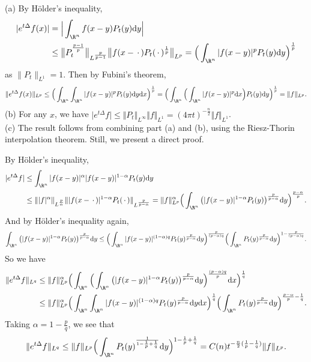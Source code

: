 \begin{itemize}
(a) By Hölder's inequality, 
\begin{align*}\vert e^{t\Delta}f(x)\vert &=\Big\vert \int_{\R^n} f(x-y)P_t(y)\mathrm{d}y\Big\vert\\ 
&\leq \big\Vert P_t^{\frac{p-1}p}\big\Vert_{L^{\frac{p}{p-1}}}\big\Vert f(x-\,\cdot\,)P_t(\,\cdot\,)^{\frac1p}\big\Vert_{L^{p}}=
\Big(\int_{\R^n} \vert f(x-y)\vert^p P_t(y) \mathrm{d}y\Big) ^{\frac1p}\end{align*}
as $\|P_t\|_{L^1}=1$. Then by Fubini's theorem, $$\Vert e^{t\Delta}f(x)\Vert_{L^p}\leq 
\Big( \int_{\R^n} \int_{\R^n} \vert f(x-y)\vert^p P_t(y)\mathrm{d}y\mathrm{d}x\Big) ^{\frac1p}=
\Big( \int_{\R^n} \Big(\int_{\R^n} \vert f(x-y)\vert^p \mathrm{d}x\Big)P_t(y)\mathrm{d}y\Big) ^{\frac1p}=\Vert f\Vert _{L^p}.$$
(b) For any $x$, we have $\vert e^{t\Delta}f\vert \leq \Vert P_t\Vert _{L^\infty} \Vert f\Vert _{L^1}=(4\pi t)^{-\frac{n}{2}}\Vert f\Vert _{L^1}$.\\
(c) The result follows from combining part (a) and (b), using the Riesz-Thorin interpolation theorem. 
Still, we present a direct proof.

By Hölder's inequality,
\begin{align*}\vert e^{t\Delta}f\vert &\leq \int_{\R^n} \vert f(x-y)\vert^\alpha\vert f(x-y)\vert^{1-\alpha} P_t(y) \mathrm{d}y\\ 
&\leq \Vert \vert f\vert^\alpha \Vert _{L^{\frac{p}\alpha}}\Vert \vert f(x-\,\cdot\,)\vert^{1-\alpha} P_t(\,\cdot\,)\Vert _{L^{\frac{p}{p-\alpha}}}
= \Vert f\Vert _{L^p}^\alpha\Big(\int_{\R^n} \big(\vert f(x-y)\vert^{1-\alpha}P_t(y)\big)^\frac{p}{p-\alpha}\mathrm{d}y\Big)^{\frac{p-\alpha}p}.\end{align*}
And by Hölder's inequality again,
$$ \int_{\R^n} \big(\vert f(x-y)\vert^{1-\alpha} P_t(y)\big)^\frac{p}{p-\alpha}\mathrm{d}y
\leq \Big(\int_{\R^n} \vert f(x-y)\vert^{(1-\alpha)q} P_t(y)^\frac{p}{p-\alpha}\mathrm{d}y\Big)^\frac{p}{(p-\alpha)q}\Big(\int_{\R^n} P_t(y)^{\frac{p}{p-\alpha}}\mathrm{d}y\Big)^{1-\frac{p}{(p-\alpha)q}}.$$
So we have
\begin{align*}\Vert e^{t\Delta}f\Vert _{L^q}&\leq \Vert f\Vert _{L^p}^\alpha\Big(\int_{\R^n}\Big(\int_{\R^n} \big(\vert f(x-y)\vert^{1-\alpha}P_t(y)\big)^\frac{p}{p-\alpha}\mathrm{d}y\Big)^{\frac{(p-\alpha)q}p}\mathrm{d}x\Big)^{\frac1q}\\
&\leq \Vert f\Vert _{L^p}^\alpha\Big(\int_{\R^n}\int_{\R^n} \vert f(x-y)\vert^{(1-\alpha)q}P_t(y)^\frac{p}{p-\alpha}\mathrm{d}y\mathrm{d}x\Big)^\frac1q\Big(\int_{\R^n} P_t(y)^{\frac{p}{p-\alpha}}\mathrm{d}y\Big)^{\frac{p-\alpha}{p}-\frac1q}.\end{align*}
Taking  $\alpha =1-\frac{p}{q}$, we see that
$$\Vert e^{t\Delta}f\Vert _{L^q}\leq \Vert f\Vert _{L^p}\Big(\int_{\R^n} P_t(y)^{\frac{1}{1-\frac1p+\frac1q}}\mathrm{d}y\Big)^{1-\frac1p+\frac1q}
=C(n)t^{-\frac{n}2(\frac1p-\frac1q)}\Vert f\Vert _{L^p}.$$ 


\end{itemize}
